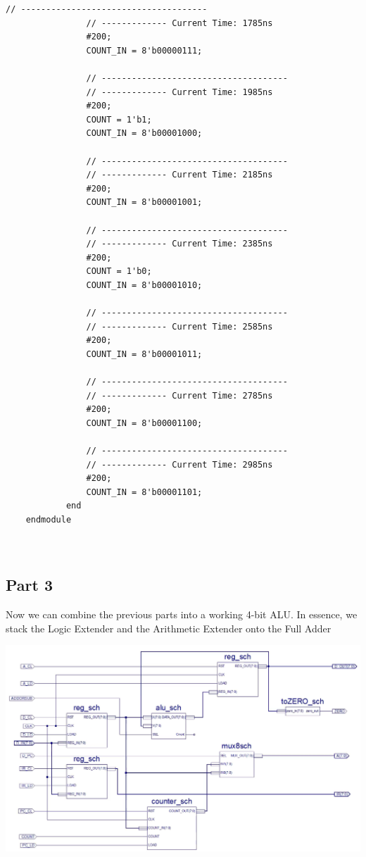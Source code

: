 \documentclass[12pt]{article}
\begin{document}
\begin{Verbatim}[frame=single, fontsize=\small]
				// -------------------------------------
				// ------------- Current Time: 1785ns 
				#200;
				COUNT_IN = 8'b00000111;
				
				// -------------------------------------
				// ------------- Current Time: 1985ns 
				#200;
				COUNT = 1'b1;
				COUNT_IN = 8'b00001000;
				
				// -------------------------------------
				// ------------- Current Time: 2185ns 
				#200;
				COUNT_IN = 8'b00001001;
				
				// -------------------------------------
				// ------------- Current Time: 2385ns 
				#200;
				COUNT = 1'b0;
				COUNT_IN = 8'b00001010;
				
				// -------------------------------------
				// ------------- Current Time: 2585ns 
				#200;
				COUNT_IN = 8'b00001011;
				
				// -------------------------------------
				// ------------- Current Time: 2785ns 
				#200;
				COUNT_IN = 8'b00001100;
				
				// -------------------------------------
				// ------------- Current Time: 2985ns 
				#200;
				COUNT_IN = 8'b00001101;
			end 
	endmodule

			
		\end{Verbatim}
\newpage
	\subsection{Part 3}
		Now we can combine the previous parts into a working 4-bit ALU. In essence, we stack the Logic Extender and the Arithmetic Extender onto the Full Adder
		\begin{center}
			\includegraphics[scale=.3]{datapath.png}
		\end{center}
\newpage
		\begin{Verbatim}[frame=single, fontsize=\small]

			
		\end{Verbatim}
			
\end{document}
